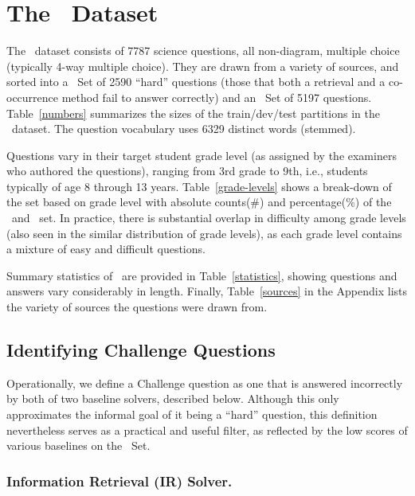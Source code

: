 \section{The \ASC~Dataset}

The \ASC~dataset consists of 7787 science questions, all non-diagram, multiple choice (typically 4-way multiple choice). They are drawn from a variety of sources, and sorted into a \Challenge~Set of 2590 ``hard'' questions (those that both a retrieval and a co-occurrence method fail to answer correctly) and an \Additional~Set of 5197 questions.
Table~\ref{numbers} summarizes the sizes of the train/dev/test partitions in the \ASC~dataset.
The question vocabulary uses 6329 distinct words (stemmed).

Questions vary in their target student grade level (as assigned by the examiners who authored the questions), ranging from 3rd grade to 9th, i.e., students typically of age 8 through 13 years. Table~\ref{grade-levels} shows a break-down of the set based on grade level with absolute counts(\#) and percentage(\%) of the \Challenge\ and \Additional\ set. In practice, there is substantial overlap in difficulty among grade levels (also seen in the similar distribution of grade levels), as each grade level contains a mixture of easy and difficult questions.

Summary statistics of \ASC~are provided in Table~\ref{statistics}, showing questions and answers vary considerably in length. Finally, Table~\ref{sources} in the Appendix lists the variety of sources the questions were drawn from.

\subsection{Identifying Challenge Questions}

Operationally, we define a Challenge question as one that is answered incorrectly by both of two baseline solvers, described below. Although this only approximates the informal goal of it being a ``hard'' question, this definition nevertheless serves as a practical and useful filter, as reflected by the low scores of various baselines on the \Challenge~Set.

\subsubsection{Information Retrieval (IR) Solver.}

